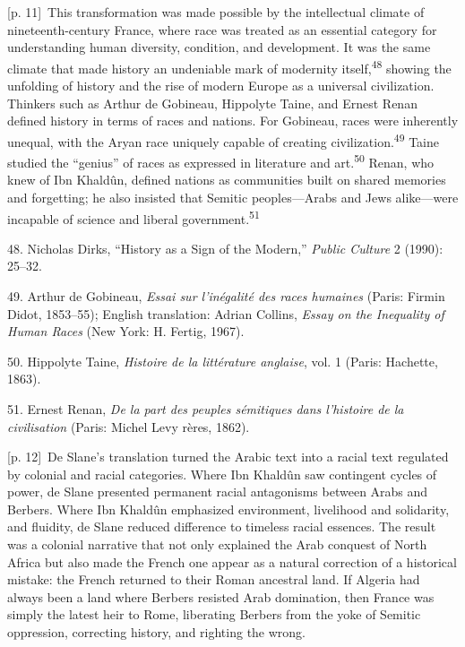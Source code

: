 \documentclass[10pt,a4paper]{article}
\begin{document}
{\scriptsize\color{gray} [p. 11]}\ This transformation was made possible by the intellectual climate of nineteenth-century France, where race was treated as an essential category for understanding human diversity, condition, and development. It was the same climate that made history an undeniable mark of modernity itself,\nobreak\textsuperscript{48} showing the unfolding of history and the rise of modern Europe as a universal civilization. Thinkers such as Arthur de Gobineau, Hippolyte Taine, and Ernest Renan defined history in terms of races and nations. For Gobineau, races were inherently unequal, with the Aryan race uniquely capable of creating civilization.\nobreak\textsuperscript{49} Taine studied the “genius” of races as expressed in literature and art.\nobreak\textsuperscript{50} Renan, who knew of Ibn Khaldûn, defined nations as communities built on shared memories and forgetting; he also insisted that Semitic peoples—Arabs and Jews alike—were incapable of science and liberal government.\nobreak\textsuperscript{51}\par{\small 48. Nicholas Dirks, “History as a Sign of the Modern,” \textit{Public Culture} 2 (1990): 25–32.\par}{\small 49. Arthur de Gobineau, \textit{Essai sur l’inégalité des races humaines} (Paris: Firmin Didot, 1853–55); English translation: Adrian Collins, \textit{Essay on the Inequality of Human Races} (New York: H. Fertig, 1967).\par}{\small 50. Hippolyte Taine, \textit{Histoire de la littérature anglaise}, vol. 1 (Paris: Hachette, 1863).\par}{\small 51. Ernest Renan, \textit{De la part des peuples sémitiques dans l’histoire de la civilisation} (Paris: Michel Levy rères, 1862).\par}
{\scriptsize\color{gray} [p. 12]}\ De Slane’s translation turned the Arabic text into a racial text regulated by colonial and racial categories. Where Ibn Khaldûn saw contingent cycles of power, de Slane presented permanent racial antagonisms between Arabs and Berbers. Where Ibn Khaldûn emphasized environment, livelihood and solidarity, and fluidity, de Slane reduced difference to timeless racial essences. The result was a colonial narrative that not only explained the Arab conquest of North Africa but also made the French one appear as a natural correction of a historical mistake: the French returned to their Roman ancestral land. If Algeria had always been a land where Berbers resisted Arab domination, then France was simply the latest heir to Rome, liberating Berbers from the yoke of Semitic oppression, correcting history, and righting the wrong.\par
\end{document}
